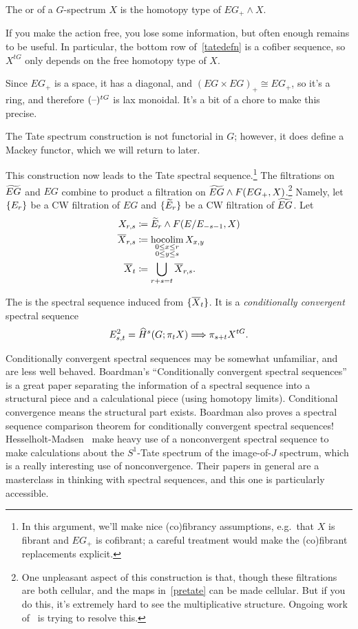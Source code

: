 \begin{defn}
The  or  of a $G$-spectrum $X$ is the homotopy type of
$EG_+\wedge X$.
\end{defn}
If you make the action free, you lose some information, but often enough remains to be useful. In particular, the
bottom row of~\eqref{tatedefn} is a cofiber sequence, so $X^{tG}$ only depends on the free homotopy type of $X$.
\begin{rem}
Since $EG_+$ is a space, it has a diagonal, and $(EG\times EG)_+\cong EG_+$, so it's a ring, and therefore
$(\text{--})^{tG}$ is lax monoidal. It's a bit of a chore to make this precise.

The Tate spectrum construction is not functorial in $G$; however, it does define a Mackey functor, which we will
return to later.
\end{rem}
This construction now leads to the Tate spectral sequence.\footnote{In this argument, we'll make nice (co)fibrancy
assumptions, e.g.\ that $X$ is fibrant and $EG_+$ is cofibrant; a careful treatment would make the (co)fibrant
replacements explicit.} The filtrations on $\widetilde{EG}$ and $EG$ combine to product a filtration on $\widetilde{EG}\wedge F(EG_+,
X)$.\footnote{One unpleasant aspect of this construction is that, though these filtrations are both cellular, and
the maps in~\eqref{pretate} can be made cellular. But if you do this, it's extremely hard to see the multiplicative
structure. Ongoing work of~ is trying to resolve this.} Namely, let $\{E_r\}$ be a CW
filtration of $EG$ and $\{\widetilde E_r\}$ be a CW filtration of $\widetilde{EG}$. Let
\begin{align*}
	X_{r,s} &\coloneqq \widetilde E_r\wedge F(E/E_{-s-1}, X)\\
	\overline X_{r,s} &\coloneqq \operatorname*{hocolim}_{\substack{0\le x\le r\\0\le y\le s}} X_{x,y}\\
	\overline X_t &\coloneqq \bigcup_{r+s=t} \overline X_{r,s}.
\end{align*}
\begin{defn}
\label{tateSS}
The  is the spectral sequence induced from $\{\overline X_t\}$. It is a
\emph{conditionally convergent} spectral sequence
\[E_{s,t}^2 = \widehat H^s(G; \pi_tX)\Longrightarrow \pi_{s+t}X^{tG}.\]
\end{defn}
\begin{rem}
Conditionally convergent spectral sequences may be somewhat unfamiliar, and are less well behaved.  Boardman's
``Conditionally convergent spectral sequences''~\cite{BoardmanCCSS} is a great paper separating the information of
a spectral sequence into a structural piece and a calculational piece (using homotopy limits). Conditional
convergence means the structural part exists. Boardman also proves a spectral sequence comparison theorem for
conditionally convergent spectral sequences! Hesselholt-Madsen~\cite{HM92} make heavy use of a nonconvergent
spectral sequence to make calculations about the $S^1$-Tate spectrum of the image-of-$J$ spectrum, which is a
really interesting use of nonconvergence. Their papers in general are a masterclass in thinking with spectral
sequences, and this one is particularly accessible.
\end{rem}
